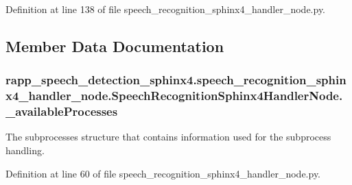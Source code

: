 Definition at line 138 of file speech\-\_\-recognition\-\_\-sphinx4\-\_\-handler\-\_\-node.\-py.



\subsection{Member Data Documentation}
\hypertarget{classrapp__speech__detection__sphinx4_1_1speech__recognition__sphinx4__handler__node_1_1SpeechRecognitionSphinx4HandlerNode_a528ab714ddc50a375936f09d62ec2a8a}{
\subsubsection[{\-\_\-available\-Processes}]{\setlength{\rightskip}{0pt plus 5cm}rapp\-\_\-speech\-\_\-detection\-\_\-sphinx4.\-speech\-\_\-recognition\-\_\-sphinx4\-\_\-handler\-\_\-node.\-Speech\-Recognition\-Sphinx4\-Handler\-Node.\-\_\-available\-Processes\hspace{0.3cm}{\ttfamily [private]}}}\label{classrapp__speech__detection__sphinx4_1_1speech__recognition__sphinx4__handler__node_1_1SpeechRecognitionSphinx4HandlerNode_a528ab714ddc50a375936f09d62ec2a8a}


The subprocesses structure that contains information used for the subprocess handling. 



Definition at line 60 of file speech\-\_\-recognition\-\_\-sphinx4\-\_\-handler\-\_\-node.\-py.

